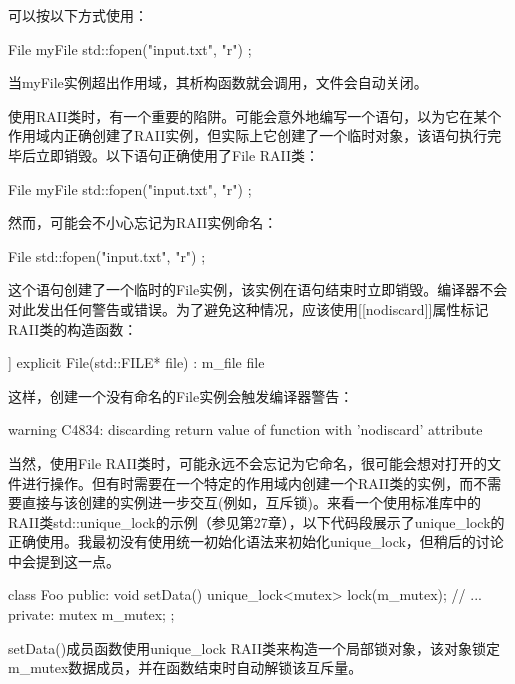 可以按以下方式使用：

\begin{cpp}
File myFile { std::fopen("input.txt", "r") };
\end{cpp}

当myFile实例超出作用域，其析构函数就会调用，文件会自动关闭。

使用RAII类时，有一个重要的陷阱。可能会意外地编写一个语句，以为它在某个作用域内正确创建了RAII实例，但实际上它创建了一个临时对象，该语句执行完毕后立即销毁。以下语句正确使用了File RAII类：

\begin{cpp}
File myFile { std::fopen("input.txt", "r") };
\end{cpp}

然而，可能会不小心忘记为RAII实例命名：

\begin{cpp}
File { std::fopen("input.txt", "r") };
\end{cpp}

这个语句创建了一个临时的File实例，该实例在语句结束时立即销毁。编译器不会对此发出任何警告或错误。为了避免这种情况，应该使用[[nodiscard]]属性标记RAII类的构造函数：

\begin{cpp}
[[nodiscard]] explicit File(std::FILE* file) : m_file{ file } { }
\end{cpp}

这样，创建一个没有命名的File实例会触发编译器警告：

\begin{shell}
warning C4834: discarding return value of function with 'nodiscard' attribute
\end{shell}

当然，使用File RAII类时，可能永远不会忘记为它命名，很可能会想对打开的文件进行操作。但有时需要在一个特定的作用域内创建一个RAII类的实例，而不需要直接与该创建的实例进一步交互(例如，互斥锁)。来看一个使用标准库中的RAII类std::unique\_lock的示例（参见第27章），以下代码段展示了unique\_lock的正确使用。我最初没有使用统一初始化语法来初始化unique\_lock，但稍后的讨论中会提到这一点。

\begin{cpp}
class Foo
{
    public:
        void setData()
        {
            unique_lock<mutex> lock(m_mutex);
            // ...
        }
    private:
        mutex m_mutex;
};
\end{cpp}

setData()成员函数使用unique\_lock RAII类来构造一个局部锁对象，该对象锁定m\_mutex数据成员，并在函数结束时自动解锁该互斥量。

